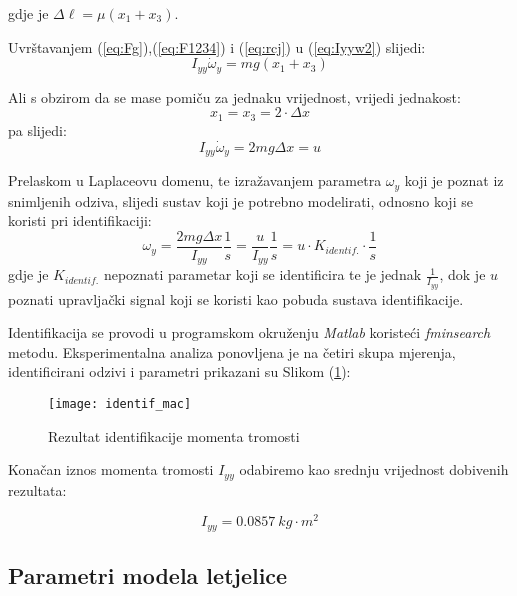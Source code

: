 \documentclass[11pt,a4paper]{article}
\begin{document}
gdje je $\Delta \ell = \mu(x_{1}  + x_{3})$.

Uvrštavanjem (\ref{eq:Fg}),(\ref{eq:F1234}) i (\ref{eq:rcj}) u (\ref{eq:Iyyw2}) slijedi:
\begin{equation}
 I_{yy}\dot{\omega}_{y} = mg(x_{1} + x_{3})
 \label{eq:Iyyw3}
 \end{equation} 
 
 Ali s obzirom da se mase pomiču za jednaku vrijednost, vrijedi jednakost:
 \begin{equation}
 x_{1} = x_{3} = 2\cdot\Delta x
 \label{eq:x1xx3}
 \end{equation}
pa slijedi:
\begin{equation}
I_{yy} \dot{\omega}_{y} = 2mg\Delta x = u
\label{eq:upr}
\end{equation}

Prelaskom u Laplaceovu domenu, te izražavanjem parametra $\omega_{y}$ koji je poznat iz snimljenih odziva, slijedi sustav koji je potrebno modelirati, odnosno koji se koristi pri identifikaciji:
\begin{equation}
\omega_{y} = \frac{2mg \Delta x}{I_{yy}} \frac{1}{s} = \frac{u}{I_{yy}} \frac{1}{s} = u \cdot K_{identif.} \cdot \frac{1}{s}
\label{eq:wy}
\end{equation}
\medskip
gdje je $K_{identif.}$ nepoznati parametar koji se identificira te je jednak $\frac{1}{I_{yy}}$, dok je $u$ poznati upravljački signal koji se koristi kao pobuda sustava identifikacije.

Identifikacija se provodi u programskom okruženju \textit{Matlab} koristeći \textit{fminsearch} metodu. Eksperimentalna analiza ponovljena je na četiri skupa mjerenja, identificirani odzivi i parametri prikazani su Slikom (\ref{fig:Iyy}):   

\begin{figure}[H]
	\centering
	\texttt{[image: identif\_mac]}
	\caption{Rezultat identifikacije momenta tromosti}
	\label{fig:Iyy}
\end{figure}

Konačan iznos momenta tromosti $I_{yy}$ odabiremo kao srednju vrijednost dobivenih rezultata:

\begin{equation}
\boxed{
I_{yy} = 0.0857 \ kg \cdot m^{2}
}
\label{eq:Iyy}
\end{equation}


\newpage

\subsection{Parametri modela letjelice}
\end{document}
